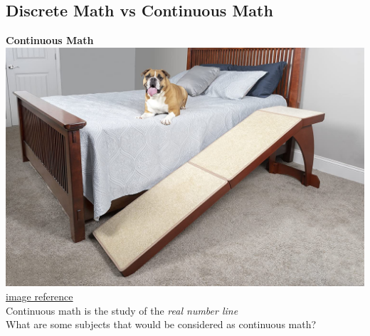 \documentclass[12pt, oneside]{article}
\begin{document}
\newpage

\subsection*{Discrete Math vs Continuous Math}

\begin{multicols}{2}
  {\bf Continuous Math}\\
  \includegraphics[scale=0.1]{../../resources/images/dog_ramp.jpg} 
  \href{https://www.google.com/imgres?imgurl=https%3A%2F%2Fm.media-amazon.com%2Fimages%2FI%2F91W-Wq9XovL._AC_SL1500_.jpg&imgrefurl=https%3A%2F%2Fwww.amazon.com%2FSolvit-62399-Wood-Bedside-Ramp%2Fdp%2FB00JKEW9DI&tbnid=2NJ4eF-687YNpM&vet=12ahUKEwid55iOp5b1AhVG0FMKHW28Bl0QMygUegUIARCpBA..i&docid=ILQVJ-0AB1zezM&w=1500&h=1000&q=dog%20bed%20ramp&ved=2ahUKEwid55iOp5b1AhVG0FMKHW28Bl0QMygUegUIARCpBA}{image reference}\\
  Continuous math is the study of the \emph{real number line}\\
  What are some subjects that would be considered as continuous math?
  

\end{multicols}
\end{document}
